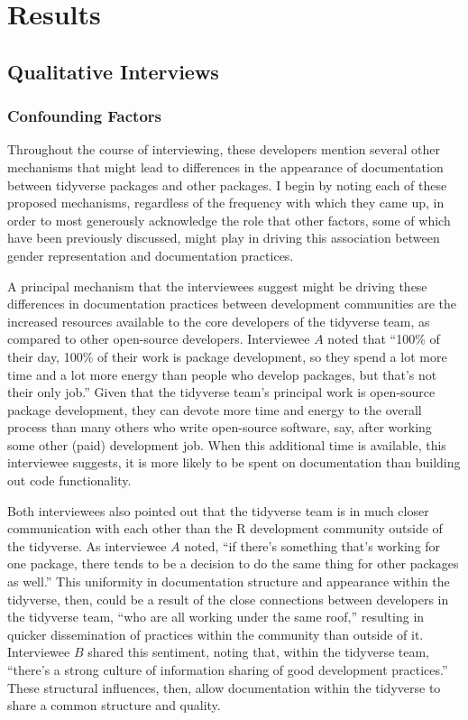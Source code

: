 \section{Results}\label{sec:results}

\subsection{Qualitative Interviews}\label{sec:results-qual}

\subsubsection{Confounding Factors} \hspace{10pt} Throughout the course of interviewing, these developers mention several other mechanisms that might lead to differences in the appearance of documentation between tidyverse packages and other packages. I begin by noting each of these proposed mechanisms, regardless of the frequency with which they came up, in order to most generously acknowledge the role that other factors, some of which have been previously discussed, might play in driving this association between gender representation and documentation practices.

A principal mechanism that the interviewees suggest might be driving these differences in documentation practices between development communities are the increased resources available to the core developers of the tidyverse team, as compared to other open-source developers. Interviewee $A$ noted that ``100\% of their day, 100\% of their work is package development, so they spend a lot more time and a lot more energy than people who develop packages, but that’s not their only job.'' Given that the tidyverse team's principal work is open-source package development, they can devote more time and energy to the overall process than many others who write open-source software, say, after working some other (paid) development job. When this additional time is available, this interviewee suggests, it is more likely to be spent on documentation than building out code functionality. 

Both interviewees also pointed out that the tidyverse team is in much closer communication with each other than the R development community outside of the tidyverse. As interviewee $A$ noted, ``if there’s something that’s working for one package, there tends to be a decision to do the same thing for other packages as well.'' This uniformity in documentation structure and appearance within the tidyverse, then, could be a result of the close connections between developers in the tidyverse team, ``who are all working under the same roof,'' resulting in quicker dissemination of practices within the community than outside of it. Interviewee $B$ shared this sentiment, noting that, within the tidyverse team, ``there’s a strong culture of information sharing of good development practices.'' These structural influences, then, allow documentation within the tidyverse to share a common structure and quality.

